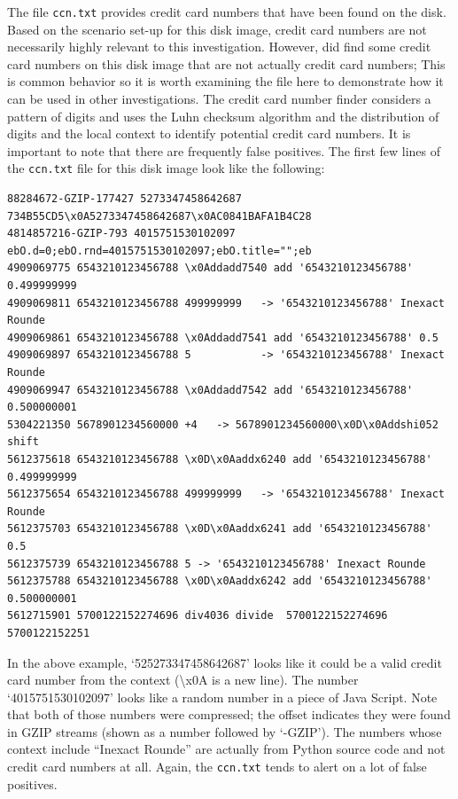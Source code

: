 The file \texttt{ccn.txt} provides credit card numbers that have been found on the disk. Based on the scenario set-up for this disk image, credit card numbers are not necessarily highly relevant to this investigation. However, \bulk did find some credit card numbers on this disk image that are not actually credit card numbers; This is common behavior so it is worth examining the file here to demonstrate how it can be used in other investigations. The credit card number finder considers a pattern of digits and uses the Luhn checksum algorithm and the distribution of digits and the local context to identify potential credit card numbers. It is important to note that there are frequently false positives. The first few lines of the \texttt{ccn.txt} file for this disk image look like the following:
\lstset{style=customfile}
\begin{lstlisting}
88284672-GZIP-177427 5273347458642687 734B55CD5\x0A5273347458642687\x0AC0841BAFA1B4C28
4814857216-GZIP-793 4015751530102097 ebO.d=0;ebO.rnd=4015751530102097;ebO.title="";eb
4909069775 6543210123456788	\x0Addadd7540 add '6543210123456788' 0.499999999
4909069811 6543210123456788 499999999   -> '6543210123456788' Inexact Rounde
4909069861 6543210123456788 \x0Addadd7541 add '6543210123456788' 0.5
4909069897 6543210123456788 5           -> '6543210123456788' Inexact Rounde
4909069947 6543210123456788 \x0Addadd7542 add '6543210123456788' 0.500000001
5304221350 5678901234560000 +4   -> 5678901234560000\x0D\x0Addshi052 shift
5612375618 6543210123456788 \x0D\x0Aaddx6240 add '6543210123456788' 0.499999999
5612375654 6543210123456788 499999999   -> '6543210123456788' Inexact Rounde
5612375703 6543210123456788 \x0D\x0Aaddx6241 add '6543210123456788' 0.5
5612375739 6543210123456788 5 -> '6543210123456788' Inexact Rounde
5612375788 6543210123456788 \x0D\x0Aaddx6242 add '6543210123456788' 0.500000001
5612715901 5700122152274696 div4036 divide  5700122152274696   5700122152251
\end{lstlisting}
In the above example, `525273347458642687' looks like it could be a valid credit card number from the context (\textbackslash x0A is a new line). The number `4015751530102097' looks like a random number in a piece of Java Script. Note that both of those numbers were compressed; the offset indicates they were found in GZIP streams (shown as a number followed by `-GZIP'). The numbers whose context include ``Inexact Rounde'' are actually from Python source code and not credit card numbers at all. Again, the \texttt{ccn.txt} tends to alert on a lot of false positives. \\

